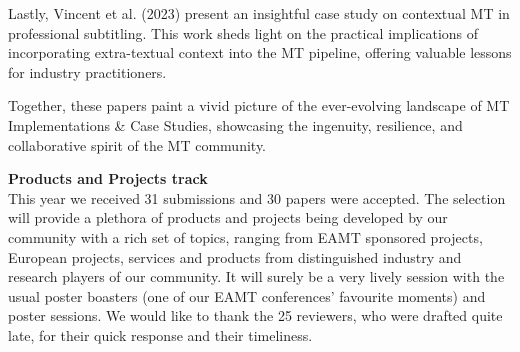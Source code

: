 Lastly, Vincent et al. (2023) present an insightful case study on contextual MT in professional subtitling. This work sheds light on the practical implications of incorporating extra-textual context into the MT pipeline, offering valuable lessons for industry practitioners.

Together, these papers paint a vivid picture of the ever-evolving landscape of MT Implementations \& Case Studies, showcasing the ingenuity, resilience, and collaborative spirit of the MT community.

{\bf Products and Projects track} \\
This year we received 31 submissions and 30 papers were accepted. The selection will provide a plethora of products and projects being developed by our community with a rich set of topics, ranging from EAMT sponsored projects, European projects, services and products from distinguished industry and research players of our community. It will surely be a very lively session with the usual poster boasters (one of our EAMT conferences’ favourite moments) and poster sessions. We would like to thank the 25 reviewers, who were drafted quite late, for their quick response and their timeliness.

